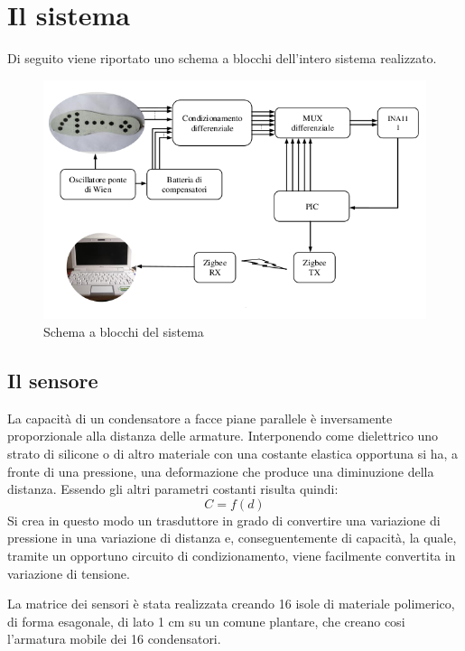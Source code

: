 \documentclass[12pt,a4paper,oneside,openright,italian]{article}
\begin{document}
\section{Il sistema}

Di seguito viene riportato uno schema a blocchi dell'intero sistema realizzato.
\begin{figure}[!hbp]
  \centering
  \includegraphics[width=350pt]{immagini/schema.png}
  \caption{Schema a blocchi del sistema}
  \label{condizionamento}
\end{figure}

\subsection{Il sensore}
La capacit\`a di un condensatore a facce piane parallele \`e inversamente proporzionale alla distanza delle armature. Interponendo come dielettrico uno strato di silicone o di altro materiale con una costante elastica opportuna si ha, a fronte di una pressione, una deformazione che produce una diminuzione della distanza. Essendo gli altri parametri costanti risulta quindi:
\begin{equation}
 C = f(d)
\end{equation}
Si crea in questo modo un trasduttore in grado di convertire una variazione di pressione in una variazione di distanza e, conseguentemente di capacit\`a, la quale, tramite un opportuno circuito di condizionamento, viene facilmente convertita in variazione di tensione. 

La matrice dei sensori \`e stata realizzata creando 16 isole di materiale polimerico, di forma esagonale, di lato 1 cm su un comune plantare, che creano cosi l'armatura mobile dei 16 condensatori. 
\end{document}

